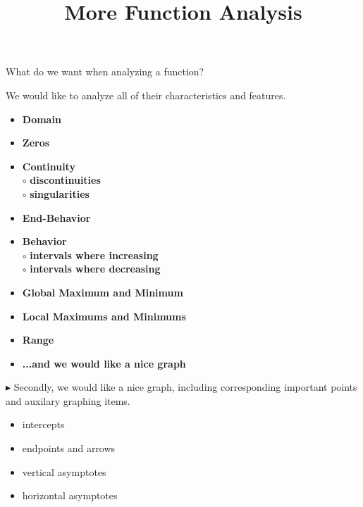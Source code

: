 \documentclass{ximera}
\title{More Function Analysis}
\begin{document}
\begin{abstract}
%
\end{abstract}
\maketitle






What do we want when analyzing a function?



We would like to analyze all of their characteristics and features. 



\begin{itemize}
     \item \textbf{\textcolor{red!70!black}{Domain}} 
     \item \textbf{\textcolor{red!70!black}{Zeros}} 
     \item \textbf{\textcolor{red!70!black}{Continuity}} \\
     \text{    }$\circ$ \textbf{\textcolor{purple!85!blue}{discontinuities}}\\
     \text{    }$\circ$ \textbf{\textcolor{purple!85!blue}{singularities}}\\
     \item \textbf{\textcolor{red!70!black}{End-Behavior}} 
     \item \textbf{\textcolor{red!70!black}{Behavior}} \\
     \text{    }$\circ$ \textbf{\textcolor{purple!85!blue}{intervals where increasing}}\\
     \text{    }$\circ$ \textbf{\textcolor{purple!85!blue}{intervals where decreasing}}\\
     \item \textbf{\textcolor{red!70!black}{Global Maximum and Minimum}} 
     \item \textbf{\textcolor{red!70!black}{Local Maximums and Minimums}} 
     \item \textbf{\textcolor{red!70!black}{Range}} 
     \item \textbf{\textcolor{blue!55!black}{...and we would like a nice graph}} 
\end{itemize}




$\blacktriangleright$ Secondly, we would like a nice graph, including corresponding important points and auxilary graphing items.

\begin{itemize}
	\item intercepts
	\item endpoints and arrows
	\item vertical asymptotes
	\item horizontal asymptotes
\end{itemize}
\end{document}
